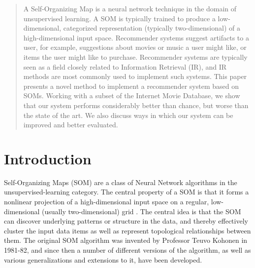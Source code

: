 \documentclass[conference]{IEEEtran}
\begin{document}
\begin{abstract}
A Self-Organizing Map is a neural network technique in the domain of unsupervised learning. A SOM is typically trained to produce a low-dimensional, categorized representation (typically two-dimensional) of a high-dimensional input space. Recommender systems suggest artifacts to a user, for example, suggestions about movies or music a user might like, or items the user might like to purchase. Recommender systems are typically seen as a field closely related to Information Retrieval (IR), and IR methods are most commonly used to implement such systems. This paper presents a novel method to implement a recommender system based on SOMs. Working with a subset of the Internet Movie Database, we show that our system performs considerably better than chance, but worse than the state of the art. We also discuss ways in which our system can be improved and better evaluated.  
\end{abstract}





%
\IEEEpeerreviewmaketitle



\section{Introduction}
Self-Organizing Maps (SOM) are a class of Neural Network algorithms in the unsupervised-learning category. The central property of a SOM is that it forms a nonlinear projection of a high-dimensional input space on a regular, low-dimensional (usually two-dimensional) grid \cite{kohonen1995springer}. The central idea is that the SOM can discover underlying patterns or structure in the data, and thereby effectively cluster the input data items as well as represent topological relationships between them. The original SOM algorithm was invented by Professor Teuvo Kohonen in 1981-82, and since then a number of different versions of the algorithm, as well as various generalizations and extensions to it, have been developed.
\end{document}
